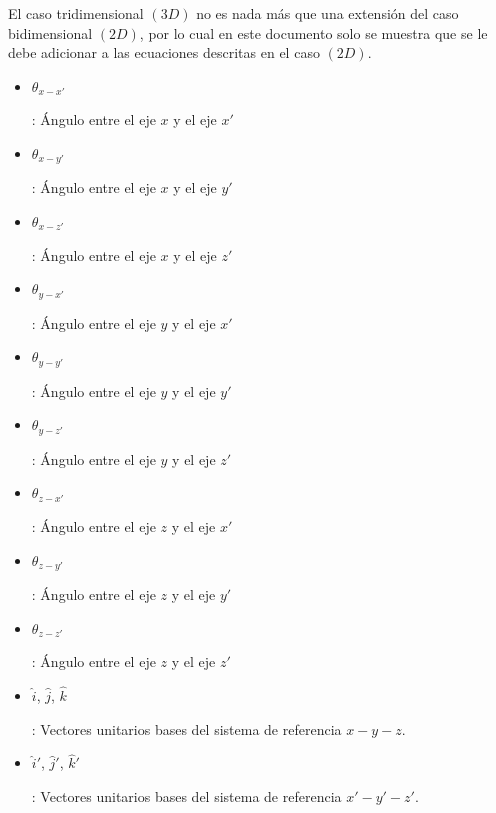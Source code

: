 \documentclass[12pt,letterpaper]{article}
\begin{document}
%
%
%
%
%
El caso tridimensional $(3D)$ no es nada más que una extensión del caso bidimensional $(2D)$, por lo cual en este documento solo se muestra que se le debe adicionar a las ecuaciones descritas en el caso $(2D)$.
%
\begin{itemize}
	\item \begin{large}$\theta_{x-x'}$\end{large}: Ángulo entre el eje $x$ y el eje $x'$
	\item \begin{large}$\theta_{x-y'}$\end{large}: Ángulo entre el eje $x$ y el eje $y'$
	\item \begin{large}$\theta_{x-z'}$\end{large}: Ángulo entre el eje $x$ y el eje $z'$
	\item \begin{large}$\theta_{y-x'}$\end{large}: Ángulo entre el eje $y$ y el eje $x'$
	\item \begin{large}$\theta_{y-y'}$\end{large}: Ángulo entre el eje $y$ y el eje $y'$
	\item \begin{large}$\theta_{y-z'}$\end{large}: Ángulo entre el eje $y$ y el eje $z'$
	\item \begin{large}$\theta_{z-x'}$\end{large}: Ángulo entre el eje $z$ y el eje $x'$
	\item \begin{large}$\theta_{z-y'}$\end{large}: Ángulo entre el eje $z$ y el eje $y'$
	\item \begin{large}$\theta_{z-z'}$\end{large}: Ángulo entre el eje $z$ y el eje $z'$
	\item \begin{large}$\hat{i}$, $\hat{j}$, $\hat{k}$\end{large}: Vectores unitarios bases del sistema de referencia $x-y-z$.
	\item \begin{large}$\hat{i}'$, $\hat{j}'$, $\hat{k}'$\end{large}: Vectores unitarios bases del sistema de referencia $x'-y'-z'$.
\end{itemize}
\end{document}
